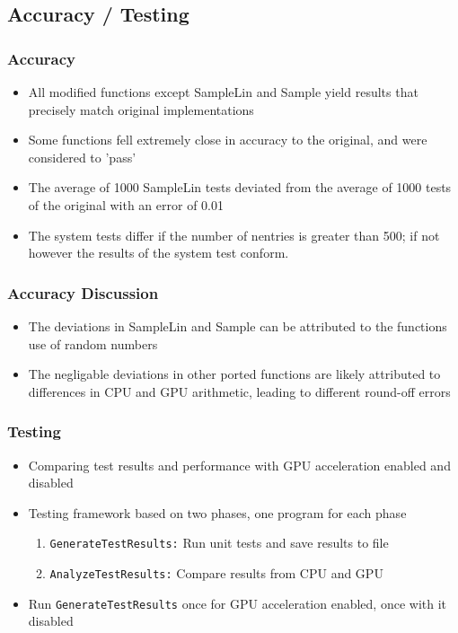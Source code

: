 \documentclass{beamer}
\begin{document}
\subsection{Accuracy / Testing}
\begin{frame}
\frametitle{Accuracy}
\begin{itemize}
\item All modified functions except SampleLin and Sample
yield results that precisely match original implementations
\end{itemize}
\begin{itemize}
\item Some functions fell extremely close in accuracy to 
the original, and were considered to 'pass'
\item The average of 1000 SampleLin tests deviated from the 
average of 1000 tests of the original with an error of 0.01 
\end{itemize}
\begin{itemize}
\item The system tests differ if the number of nentries is 
greater than 500; if not however the results of the system 
test conform.
\end{itemize}
\end{frame}

\begin{frame}
\frametitle{Accuracy Discussion}
\begin{itemize}
\item The deviations in SampleLin and Sample can be 
attributed to the functions use of random numbers
\item The negligable deviations in other ported functions 
are likely attributed to differences in CPU and GPU 
arithmetic, leading to different round-off errors
\end{itemize}
\end{frame}

\begin{frame}
\frametitle{Testing}
\begin{itemize}
\item Comparing test results and performance with GPU acceleration enabled and disabled
\item Testing framework based on two phases, one program for each phase
\begin{enumerate}
\item \texttt{GenerateTestResults:} Run unit tests and save results to file
\item \texttt{AnalyzeTestResults:} Compare results from CPU and GPU
\end{enumerate}
\item Run \texttt{GenerateTestResults} once for GPU acceleration enabled, once with it disabled
\end{itemize}
\end{frame}
\end{document}
